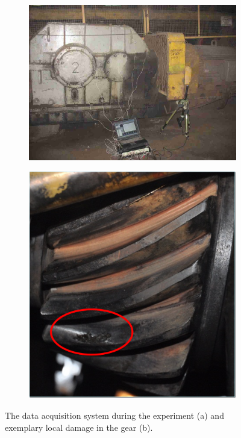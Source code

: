 %
\begin{figure}[!ht]
    \centering
    \begin{subfigure}[b]{0.49\textwidth}
        \centering
        \captionsetup{skip=0.01pt}
        \caption{}
        \includegraphics[width=\textwidth]{wykresy/chapter_application/semi_blind/czujniki}
        \label{fig:chapter7/semi_blind/pomiar}
    \end{subfigure}
    \begin{subfigure}[b]{0.49\textwidth}
        \centering
        \captionsetup{skip=0.01pt}
        \caption{}
        \includegraphics[width=\textwidth]{wykresy/chapter_application/semi_blind/damage}
        \label{fig:chapter7/semi_blind/damage}
    \end{subfigure}    
    \caption{The data acquisition system during the experiment (a) and exemplary local damage in the gear (b).}
\end{figure}
